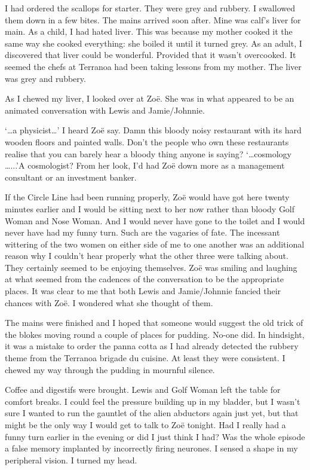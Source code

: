 I had ordered the scallops for
starter. They were grey and rubbery. I swallowed them down in a few bites. The mains arrived soon after. Mine was calf's liver for main. As a child, I had hated
liver. This was because my mother cooked it the same way she cooked
everything: she boiled it until it turned grey. As an adult, I
discovered that liver could be wonderful. Provided that it
wasn't overcooked. It seemed the chefs at Terranoa had been taking
lessons from my mother.  The
liver was grey and rubbery.

As I chewed my liver, I looked over at Zo{\"e}. She was in
what appeared to be an animated conversation with Lewis and Jamie/Johnnie.

`{\dots}a physicist\dots' I heard Zo{\"e} say. Damn this bloody
noisy restaurant with its hard wooden floors and painted walls.
Don't the people who own these restaurants realise that you can
barely hear a bloody thing anyone is saying? `{\dots}cosmology
\dots...'A cosmologist? From her look, I'd had Zo{\"e} down more as a management
consultant or an investment banker.

If the Circle Line had been running properly, Zo{\"e} would have got
here twenty minutes earlier and I would be sitting next to her now
rather than bloody Golf Woman and Nose Woman. And I would never have gone to the toilet and I would never have had my funny turn. Such are the vagaries of fate. The
incessant wittering of the two women on either side of me to one another was an additional reason why I couldn't hear properly what
the other three were talking about. They certainly seemed to be
enjoying themselves. Zo{\"e} was smiling and laughing at what seemed
from the cadences of the conversation to be the appropriate places.
It was clear to me that both Lewis and Jamie/Johnnie fancied their
chances with Zo{\"e}. I wondered what she thought of them.

The mains were finished and I hoped that someone would suggest the old trick
of the blokes moving round a couple of places for pudding. No-one did. In hindsight,
it was a mistake to order the panna cotta as I had already detected the
rubbery theme from the Terranoa brigade du cuisine. At least they were consistent. I chewed my way through the pudding in mournful silence.

Coffee and digestifs were brought. Lewis and Golf Woman left the
table for comfort breaks. I could feel the pressure building up in my bladder, but I wasn't sure I wanted to run the gauntlet of the alien abductors again just yet, but that might be the only way I would get to talk to Zo{\"e} tonight. Had I really had a funny turn earlier in the evening or did I just think I had? Was the whole episode a false memory implanted by incorrectly firing neurones. I sensed a shape in my peripheral vision. I turned my head.

